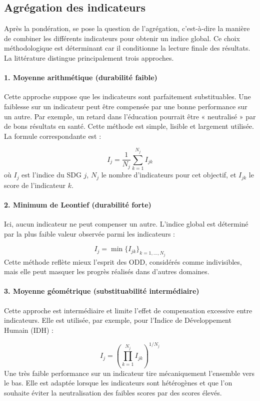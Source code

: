 \subsection*{Agrégation des indicateurs}

Après la pondération, se pose la question de l’agrégation, c’est-à-dire la manière de combiner les différents indicateurs pour obtenir un indice global. Ce choix méthodologique est déterminant car il conditionne la lecture finale des résultats. La littérature distingue principalement trois approches.

\paragraph{1. Moyenne arithmétique (durabilité faible)}  
Cette approche suppose que les indicateurs sont parfaitement substituables. Une faiblesse sur un indicateur peut être compensée par une bonne performance sur un autre. Par exemple, un retard dans l’éducation pourrait être « neutralisé » par de bons résultats en santé. Cette méthode est simple, lisible et largement utilisée. La formule correspondante est :
\begin{simplebox2}
\begin{equation}
I_j = \frac{1}{N_j} \sum_{k=1}^{N_j} I_{jk}
\end{equation}
où $I_j$ est l’indice du SDG $j$, $N_j$ le nombre d’indicateurs pour cet objectif, et $I_{jk}$ le score de l’indicateur $k$.
\end{simplebox2}

\paragraph{2. Minimum de Leontief (durabilité forte)}  
Ici, aucun indicateur ne peut compenser un autre. L’indice global est déterminé par la plus faible valeur observée parmi les indicateurs :
\begin{simplebox2}
\begin{equation}
I_j = \min \{ I_{jk} \}_{k=1,\dots,N_j}
\end{equation}
Cette méthode reflète mieux l’esprit des ODD, considérés comme indivisibles, mais elle peut masquer les progrès réalisés dans d’autres domaines.
\end{simplebox2}

\paragraph{3. Moyenne géométrique (substituabilité intermédiaire)}  
Cette approche est intermédiaire et limite l’effet de compensation excessive entre indicateurs. Elle est utilisée, par exemple, pour l’Indice de Développement Humain (IDH) :
\begin{simplebox2}
\begin{equation}
I_j = \left( \prod_{k=1}^{N_j} I_{jk} \right)^{1/N_j}
\end{equation}
Une très faible performance sur un indicateur tire mécaniquement l’ensemble vers le bas. Elle est adaptée lorsque les indicateurs sont hétérogènes et que l’on souhaite éviter la neutralisation des faibles scores par des scores élevés.
\end{simplebox2}

